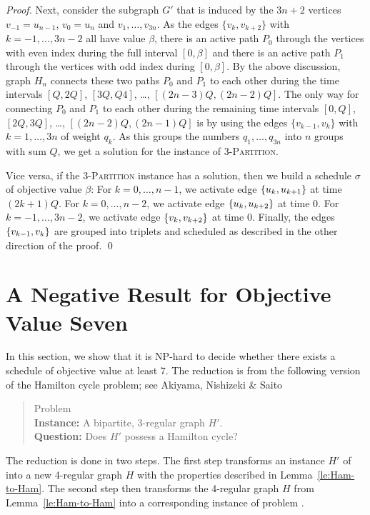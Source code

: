 \begin{proof}
Next, consider the subgraph $G'$ that is induced by the $3n+2$ vertices $v_{-1}=u_{n-1}$, $v_0=u_n$ and 
$v_1,\ldots,v_{3n}$.
As the edges $\{v_k, v_{k+2}\}$ with $k=-1,\ldots,3n-2$ all have value $\beta$, there is an active path $P_0$ 
through the vertices with even index during the full interval $[0,\beta]$ and there is an active 
path $P_1$ through the vertices with odd index during $[0, \beta]$.
By the above discussion, graph $H_n$ connects these two paths $P_0$ and $P_1$ to each other during the
time intervals $[Q,2Q]$, $[3Q,Q4]$, \dots, $[(2n-3)Q,(2n-2)Q]$.
The only way for connecting $P_0$ and $P_1$ to each other during the remaining time intervals 
$[0,Q]$, $[2Q,3Q]$, \dots, $[(2n-2)Q,(2n-1)Q]$ is by using the edges $\{v_{k-1},v_k\}$ with $k=1,\ldots,3n$ of 
weight $q_k$.
As this groups the numbers $q_1,\ldots,q_{3n}$ into $n$ groups with sum $Q$, we get a solution
for the instance of \textsc{3-Partition}.

Vice versa, if the \textsc{3-Partition} instance has a solution, then we  build a schedule $\sigma$
of objective value $\beta$: For $k=0,\ldots,n-1$, we activate edge $\{ u_k, u_{k+1} \}$ at time $(2k+1)Q$. For $k=0,\ldots,n-2$, we activate edge $\{ u_k, u_{k+2} \}$ at time $0$. For $k=-1,\ldots,3n-2$, we activate edge $\{ v_k, v_{k+2} \}$ at time $0$. Finally, the edges $\{ v_{k-1},v_k \}$ are grouped into triplets and scheduled as described in the other direction of the proof.
\qed
\end{proof}


\section{A Negative Result for Objective Value Seven}
\label{sec:value-seven}
In this section, we show that it is NP-hard to decide whether there exists a schedule of objective value at least 7. 
The reduction is from the following version of the Hamilton cycle problem; 
see Akiyama, Nishizeki \& Saito \cite{hamilton3regularBip}
\begin{quote}
Problem {\xxxHAM}
\\
\textbf{Instance:} A bipartite, 3-regular graph $H'$.  
\\
\textbf{Question:} Does $H'$ possess a Hamilton cycle? 
\end{quote}
The reduction is done in two steps.
The first step transforms an instance $H'$ of {\xxxHAM} into a new 4-regular graph $H$ 
with the properties described in Lemma~\ref{le:Ham-to-Ham}.
The second step then transforms the 4-regular graph $H$ from Lemma~\ref{le:Ham-to-Ham}
into a corresponding instance of problem {\xxxNTP}.

